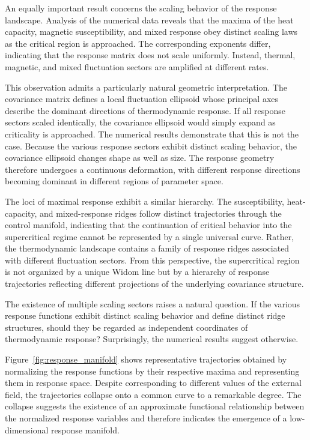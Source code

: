 An equally important result concerns the scaling behavior of the
response landscape. Analysis of the numerical data reveals that
the maxima of the heat capacity, magnetic susceptibility, and
mixed response obey distinct scaling laws as the critical
region is approached. The corresponding exponents differ,
indicating that the response matrix does not scale uniformly.
Instead, thermal, magnetic, and mixed fluctuation sectors are
amplified at different rates.

This observation admits a particularly natural geometric
interpretation. The covariance matrix defines a local
fluctuation ellipsoid whose principal axes describe the
dominant directions of thermodynamic response. If all response
sectors scaled identically, the covariance ellipsoid would
simply expand as criticality is approached. The numerical
results demonstrate that this is not the case. Because the
various response sectors exhibit distinct scaling behavior, the
covariance ellipsoid changes shape as well as size. The
response geometry therefore undergoes a continuous deformation,
with different response directions becoming dominant in
different regions of parameter space.

The loci of maximal response exhibit a similar hierarchy. The
susceptibility, heat-capacity, and mixed-response ridges follow
distinct trajectories through the control manifold, indicating
that the continuation of critical behavior into the
supercritical regime cannot be represented by a single
universal curve. Rather, the thermodynamic landscape contains a
family of response ridges associated with different fluctuation
sectors. From this perspective, the supercritical region is not
organized by a unique Widom line but by a hierarchy of response
trajectories reflecting different projections of the underlying
covariance structure.

The existence of multiple scaling sectors raises a natural
question. If the various response functions exhibit distinct
scaling behavior and define distinct ridge structures, should
they be regarded as independent coordinates of thermodynamic
response? Surprisingly, the numerical results suggest
otherwise.



Figure~\ref{fig:response_manifold} shows representative
trajectories obtained by normalizing the response functions by
their respective maxima and representing them in response
space. Despite corresponding to different values of the
external field, the trajectories collapse onto a common curve
to a remarkable degree. The collapse suggests the existence of
an approximate functional relationship between the normalized
response variables and therefore indicates the emergence of a
low-dimensional response manifold.

